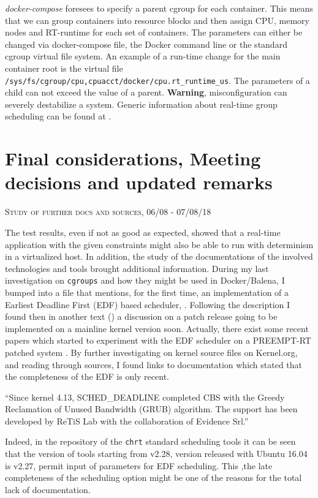 \documentclass[]{scrartcl}
\begin{document}
\textit{docker-compose} foresees to specify a parent cgroup for each container. This means that we can group containers into resource blocks and then assign CPU, memory nodes and RT-runtime for each set of containers.
The parameters can either be changed via docker-compose file, the Docker command line or the standard cgroup virtual file system. An example of a run-time change for the main container root is the virtual file \texttt{/sys/fs/cgroup/cpu,cpuacct/docker/cpu.rt\_runtime\_us}.
The parameters of a child can not exceed the value of a parent. \textbf{Warning}, misconfiguration can severely destabilize a system. Generic information about real-time group scheduling can be found at \cite{kernel01}.

\section{Final considerations, Meeting decisions and updated remarks}

{\small\textsc{Study of further docs and sources, 06/08 - 07/08/18} \bigskip}

The test results, even if not as good as expected, showed that a real-time application with the given constraints might also be able to run with determinism in a virtualized host.
In addition, the study of the documentations of the involved technologies and tools brought additional information.
During my last investigation on \texttt{cgroups} and how they might be used in Docker/Balena, I bumped into a file that mentions, for the first time, an implementation of a Earliest Deadline First (EDF) based scheduler, \cite{kernel01}.
Following the description I found then in another text
(\cite{kernel02}) a discussion on a patch release going to be implemented on a mainline kernel version soon. Actually, there exist some recent papers which started to experiment with the EDF scheduler on a PREEMPT-RT patched system \cite{Buelnaetal2017}.
By further investigating on kernel source files on Kernel.org, and reading through sources, I found links to documentation \cite{wiki01} which stated that the completeness of the EDF is only recent.
\bigskip

``Since kernel 4.13, SCHED\_DEADLINE completed CBS with the Greedy Reclamation of Unused Bandwidth (GRUB) algorithm. The support has been developed by ReTiS Lab with the collaboration of Evidence Srl.''
\bigskip

Indeed, in the repository of the \texttt{chrt} standard scheduling tools \cite{schtools01} it can be seen that the version of tools starting from v2.28, version released with Ubuntu 16.04 is v2.27, permit input of  parameters for EDF scheduling.
This ,the late completeness of the scheduling option might be one of the reasons for the total lack of documentation.
\end{document}
